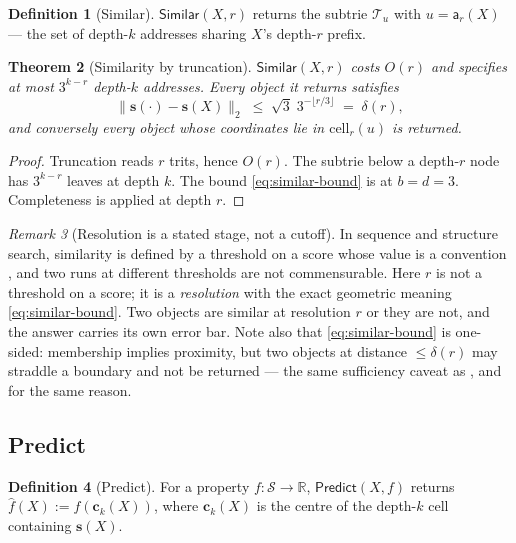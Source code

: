\documentclass[11pt,twocolumn,a4paper]{article}
\theoremstyle{thmstyle}
\newtheorem{theorem}{Theorem}[section]
\theoremstyle{definition}
\newtheorem{definition}[theorem]{Definition}
\theoremstyle{remark}
\newtheorem{remark}[theorem]{Remark}
\newcommand{\R}{\mathbb{R}}
\newcommand{\Sspace}{\mathcal{S}}
\newcommand{\Trie}{\mathscr{T}}
\newcommand{\addr}{\mathsf{a}}
\newcommand{\norm}[1]{\lVert#1\rVert}
\begin{document}
\begin{definition}[Similar]
\label{def:similar}
$\textsf{Similar}(X,r)$ returns the subtrie $\Trie_u$ with
$u = \addr_r(X)$ --- the set of depth-$k$ addresses sharing $X$'s
depth-$r$ prefix.
\end{definition}

\begin{theorem}[Similarity by truncation]
\label{thm:similar}
$\textsf{Similar}(X,r)$ costs $O(r)$ and specifies at most $3^{k-r}$
depth-$k$ addresses. Every object it returns satisfies
\begin{equation}
  \norm{\mathbf{s}(\cdot) - \mathbf{s}(X)}_2
  \;\leq\; \sqrt3\; 3^{-\lfloor r/3\rfloor} \;=\; \delta(r),
  \label{eq:similar-bound}
\end{equation}
and conversely every object whose coordinates lie in
$\mathrm{cell}_r(u)$ is returned.
\end{theorem}

\begin{proof}
Truncation reads $r$ trits, hence $O(r)$. The subtrie below a depth-$r$
node has $3^{k-r}$ leaves at depth $k$. The bound
\eqref{eq:similar-bound} is  at $b=d=3$.
Completeness is  applied at depth $r$.
\end{proof}

\begin{remark}[Resolution is a stated stage, not a cutoff]
\label{rem:similar-cutoff}
In sequence and structure search, similarity is defined by a threshold
on a score whose value is a convention
\citep{smith1981,altschul1990,holm1993,steinegger2017,vankempen2024},
and two runs at different thresholds are not commensurable. Here $r$ is
not a threshold on a score; it is a \emph{resolution} with the exact
geometric meaning \eqref{eq:similar-bound}. Two objects are similar at
resolution $r$ or they are not, and the answer carries its own error
bar. Note also that \eqref{eq:similar-bound} is one-sided:
membership implies proximity, but two objects at distance
$\leq \delta(r)$ may straddle a boundary and not be returned --- the
same sufficiency caveat as , and for the same
reason.
\end{remark}

\subsection{Predict}

\begin{definition}[Predict]
\label{def:predict}
For a property $f\colon \Sspace\to\R$, $\textsf{Predict}(X,f)$ returns
$\hat f(X) := f(\mathbf{c}_k(X))$, where $\mathbf{c}_k(X)$ is the
centre of the depth-$k$ cell containing $\mathbf{s}(X)$.
\end{definition}
\end{document}
